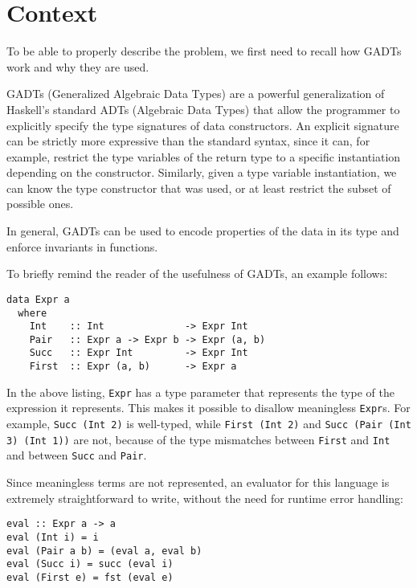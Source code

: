 \section{Context}
\label{sec:context}

To be able to properly describe the problem, we first need to recall how GADTs work and why they are used.

GADTs (Generalized Algebraic Data Types) are a powerful generalization of Haskell's standard ADTs (Algebraic Data Types) that allow the programmer to explicitly specify the type signatures of data constructors\cite{simple-unification-based-type-inference-for-gadts}.
An explicit signature can be strictly more expressive than the standard syntax, since it can, for example, restrict the type variables of the return type to a specific instantiation depending on the constructor.
Similarly, given a type variable instantiation, we can know the type constructor that was used, or at least restrict the subset of possible ones.

In general, GADTs can be used to encode properties of the data in its type and enforce invariants in functions.

To briefly remind the reader of the usefulness of GADTs, an example follows:

\begin{lstlisting}[caption=A GADT describing a simple language with ints and pairs]
data Expr a
  where
    Int    :: Int              -> Expr Int
    Pair   :: Expr a -> Expr b -> Expr (a, b)
    Succ   :: Expr Int         -> Expr Int
    First  :: Expr (a, b)      -> Expr a
\end{lstlisting}

In the above listing, \texttt{Expr} has a type parameter that represents the type of the expression it represents.
This makes it possible to disallow meaningless \texttt{Expr}s.
For example, \texttt{Succ (Int 2)} is well-typed, while \texttt{First (Int 2)} and \texttt{Succ (Pair (Int 3) (Int 1))} are not, because of the type mismatches between \texttt{First} and \texttt{Int} and between \texttt{Succ} and \texttt{Pair}.

Since meaningless terms are not represented, an evaluator for this language is extremely straightforward to write, without the need for runtime error handling:

\begin{lstlisting}[caption=Evaluator for \texttt{Expr}]
eval :: Expr a -> a
eval (Int i) = i
eval (Pair a b) = (eval a, eval b)
eval (Succ i) = succ (eval i)
eval (First e) = fst (eval e)
\end{lstlisting}

